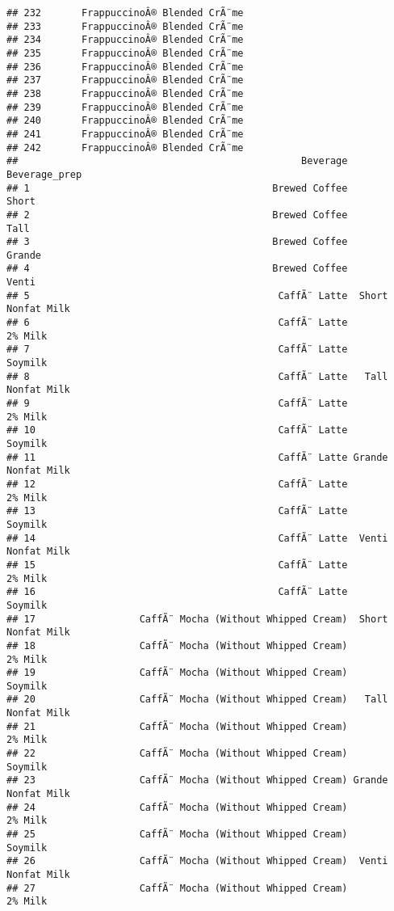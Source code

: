 \documentclass[
]{article}
\begin{document}
\begin{verbatim}
## 232       FrappuccinoÂ® Blended CrÃ¨me
## 233       FrappuccinoÂ® Blended CrÃ¨me
## 234       FrappuccinoÂ® Blended CrÃ¨me
## 235       FrappuccinoÂ® Blended CrÃ¨me
## 236       FrappuccinoÂ® Blended CrÃ¨me
## 237       FrappuccinoÂ® Blended CrÃ¨me
## 238       FrappuccinoÂ® Blended CrÃ¨me
## 239       FrappuccinoÂ® Blended CrÃ¨me
## 240       FrappuccinoÂ® Blended CrÃ¨me
## 241       FrappuccinoÂ® Blended CrÃ¨me
## 242       FrappuccinoÂ® Blended CrÃ¨me
##                                                 Beverage      Beverage_prep
## 1                                          Brewed Coffee              Short
## 2                                          Brewed Coffee               Tall
## 3                                          Brewed Coffee             Grande
## 4                                          Brewed Coffee              Venti
## 5                                           CaffÃ¨ Latte  Short Nonfat Milk
## 6                                           CaffÃ¨ Latte            2% Milk
## 7                                           CaffÃ¨ Latte            Soymilk
## 8                                           CaffÃ¨ Latte   Tall Nonfat Milk
## 9                                           CaffÃ¨ Latte            2% Milk
## 10                                          CaffÃ¨ Latte            Soymilk
## 11                                          CaffÃ¨ Latte Grande Nonfat Milk
## 12                                          CaffÃ¨ Latte            2% Milk
## 13                                          CaffÃ¨ Latte            Soymilk
## 14                                          CaffÃ¨ Latte  Venti Nonfat Milk
## 15                                          CaffÃ¨ Latte            2% Milk
## 16                                          CaffÃ¨ Latte            Soymilk
## 17                  CaffÃ¨ Mocha (Without Whipped Cream)  Short Nonfat Milk
## 18                  CaffÃ¨ Mocha (Without Whipped Cream)            2% Milk
## 19                  CaffÃ¨ Mocha (Without Whipped Cream)            Soymilk
## 20                  CaffÃ¨ Mocha (Without Whipped Cream)   Tall Nonfat Milk
## 21                  CaffÃ¨ Mocha (Without Whipped Cream)            2% Milk
## 22                  CaffÃ¨ Mocha (Without Whipped Cream)            Soymilk
## 23                  CaffÃ¨ Mocha (Without Whipped Cream) Grande Nonfat Milk
## 24                  CaffÃ¨ Mocha (Without Whipped Cream)            2% Milk
## 25                  CaffÃ¨ Mocha (Without Whipped Cream)            Soymilk
## 26                  CaffÃ¨ Mocha (Without Whipped Cream)  Venti Nonfat Milk
## 27                  CaffÃ¨ Mocha (Without Whipped Cream)            2% Milk

\end{verbatim}
\end{document}
